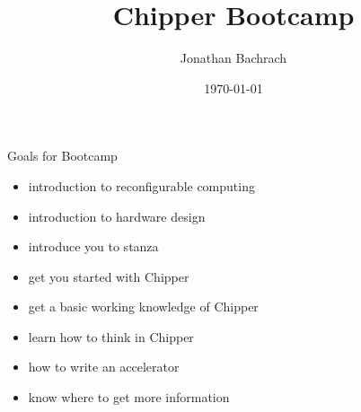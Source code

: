 \documentclass[xcolor=pdflatex,dvipsnames,table]{beamer}
\title{Chipper Bootcamp}
\author{Jonathan Bachrach}
\date{\today}
\institute[UC Berkeley]{EECS UC Berkeley}
\begin{document}
\begin{frame}
\titlepage
\end{frame}
\addtocounter{framenumber}{-1}

\begin{frame}[fragile]{Goals for Bootcamp}

\begin{itemize}
\item introduction to reconfigurable computing
\item introduction to hardware design
\item introduce you to stanza
\item get you started with Chipper
\item get a basic working knowledge of Chipper
\item learn how to think in Chipper
\item how to write an accelerator
\item know where to get more information
\end{itemize}

\end{frame}
\end{document}
